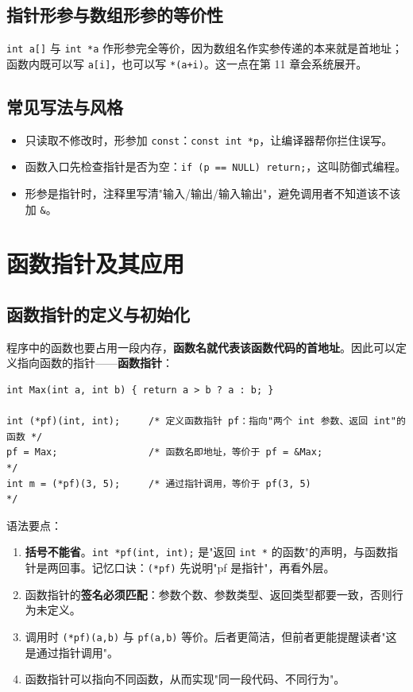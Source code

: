 \subsection{指针形参与数组形参的等价性}
\texttt{int a[]} 与 \texttt{int *a} 作形参完全等价，因为数组名作实参传递的本来就是首地址；函数内既可以写 \texttt{a[i]}，也可以写 \texttt{*(a+i)}。这一点在第 11 章会系统展开。

\subsection{常见写法与风格}
\begin{itemize}
  \item 只读取不修改时，形参加 \texttt{const}：\texttt{const int *p}，让编译器帮你拦住误写。
  \item 函数入口先检查指针是否为空：\texttt{if (p == NULL) return;}，这叫防御式编程。
  \item 形参是指针时，注释里写清"输入/输出/输入输出"，避免调用者不知道该不该加 \texttt{\&}。
\end{itemize}

\section{函数指针及其应用}
\subsection{函数指针的定义与初始化}
程序中的函数也要占用一段内存，\textbf{函数名就代表该函数代码的首地址}。因此可以定义指向函数的指针——\textbf{函数指针}：
\begin{lstlisting}
int Max(int a, int b) { return a > b ? a : b; }

int (*pf)(int, int);     /* 定义函数指针 pf：指向"两个 int 参数、返回 int"的函数 */
pf = Max;                /* 函数名即地址，等价于 pf = &Max;                     */
int m = (*pf)(3, 5);     /* 通过指针调用，等价于 pf(3, 5)                       */
\end{lstlisting}

语法要点：
\begin{enumerate}
  \item \textbf{括号不能省}。\texttt{int *pf(int, int);} 是"返回 \texttt{int *} 的函数"的声明，与函数指针是两回事。记忆口诀：\texttt{(*pf)} 先说明"pf 是指针"，再看外层。
  \item 函数指针的\textbf{签名必须匹配}：参数个数、参数类型、返回类型都要一致，否则行为未定义。
  \item 调用时 \texttt{(*pf)(a,b)} 与 \texttt{pf(a,b)} 等价。后者更简洁，但前者更能提醒读者"这是通过指针调用"。
  \item 函数指针可以指向不同函数，从而实现"同一段代码、不同行为"。
\end{enumerate}

